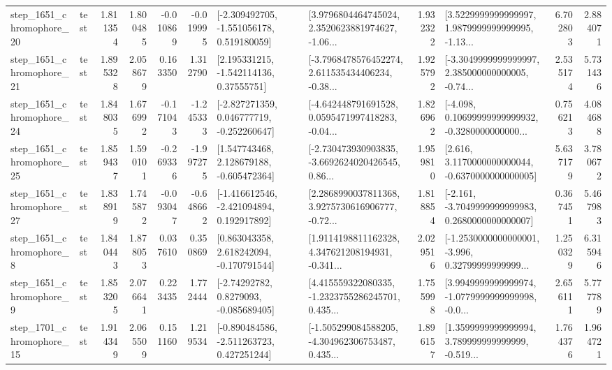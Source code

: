 \begin{tabular}{llrrrrllrlrr}
 step\_1651\_chromophore\_20 &      test &      1.811354 &    1.800485 &     -0.010869 & -0.019995 &   [-2.309492705, -1.551056178, 0.519180059] &  [3.9796804464745024, 2.3520623881974627, -1.06... &       1.932322 &  [3.5229999999999997, 1.9879999999999995, -1.13... &            6.702803 &          2.884071 \\
 step\_1651\_chromophore\_21 &      test &      1.895328 &    2.058679 &      0.163350 &  1.312790 &     [2.195331215, -1.542114136, 0.37555751] &  [-3.7968478576452274, 2.611535434406234, -0.38... &       1.925792 &  [-3.3049999999999997, 2.385000000000005, -0.74... &            2.535174 &          5.731436 \\
 step\_1651\_chromophore\_24 &      test &      1.848035 &    1.676992 &     -0.171043 & -1.245333 &   [-2.827271359, 0.046777719, -0.252260647] &  [-4.642448791691528, 0.0595471997418283, -0.04... &       1.826962 &  [-4.098, 0.10699999999999932, -0.3280000000000... &            0.756213 &          4.084688 \\
 step\_1651\_chromophore\_25 &      test &      1.859437 &    1.590101 &     -0.269336 & -1.997275 &    [1.547743468, 2.128679188, -0.605472364] &  [-2.730473930903835, -3.6692624020426545, 0.86... &       1.959810 &   [2.616, 3.1170000000000044, -0.6370000000000005] &            5.637179 &          3.780672 \\
 step\_1651\_chromophore\_27 &      test &      1.838919 &    1.745872 &     -0.093047 & -0.648662 &   [-1.416612546, -2.421094894, 0.192917892] &  [2.2868990037811368, 3.9275730616906777, -0.72... &       1.818854 &  [-2.161, -3.7049999999999983, 0.2680000000000007] &            0.367451 &          5.467983 \\
  step\_1651\_chromophore\_8 &      test &      1.840443 &    1.878053 &      0.037610 &  0.350869 &    [0.863043358, 2.618242094, -0.170791544] &  [1.9114198811162328, 4.347621208194931, -0.341... &       2.029516 &  [-1.2530000000000001, -3.996, 0.32799999999999... &            1.250329 &          6.315946 \\
  step\_1651\_chromophore\_9 &      test &      1.853205 &    2.076641 &      0.223435 &  1.772444 &      [-2.74292782, 0.8279093, -0.085689405] &  [4.415559322080335, -1.2323755286245701, 0.435... &       1.755998 &  [3.9949999999999974, -1.0779999999999998, -0.0... &            2.656111 &          5.777789 \\
 step\_1701\_chromophore\_15 &      test &      1.914349 &    2.065509 &      0.151160 &  1.219534 &   [-0.890484586, -2.511263723, 0.427251244] &  [-1.505299084588205, -4.304962306753487, 0.435... &       1.896157 &  [1.3599999999999994, 3.789999999999999, -0.519... &            1.764376 &          1.964721 \\

\end{tabular}

